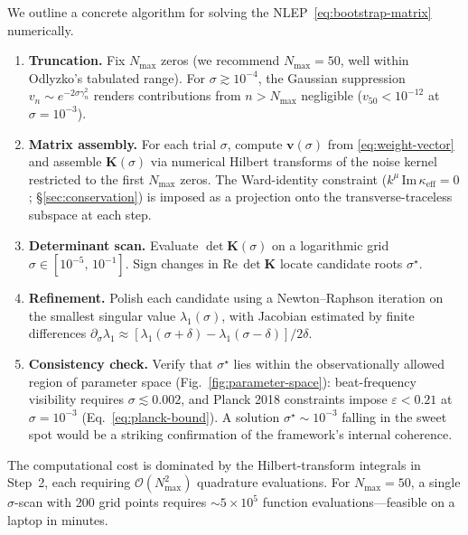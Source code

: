 \documentclass[12pt,a4paper]{article}
\begin{document}
We outline a concrete algorithm for solving the
NLEP~\eqref{eq:bootstrap-matrix} numerically.

\begin{enumerate}
  \item \textbf{Truncation.}
    Fix $N_{\max}$ zeros (we recommend $N_{\max} = 50$, well
    within Odlyzko's tabulated range).
    For $\sigma \gtrsim 10^{-4}$, the Gaussian suppression
    $v_{n} \sim e^{-2\sigma\gamma_{n}^{2}}$ renders contributions
    from $n > N_{\max}$ negligible ($v_{50} < 10^{-12}$ at
    $\sigma = 10^{-3}$).

  \item \textbf{Matrix assembly.}
    For each trial $\sigma$, compute $\mathbf{v}(\sigma)$ from
    \eqref{eq:weight-vector} and assemble $\mathbf{K}(\sigma)$
    via numerical Hilbert transforms of the noise kernel restricted
    to the first $N_{\max}$ zeros.
    The Ward-identity constraint
    ($k^{\mu}\,\mathrm{Im}\,\kappa_{\mathrm{eff}} = 0$;
    \S\ref{sec:conservation}) is imposed as a
    projection onto the transverse-traceless subspace at each step.

  \item \textbf{Determinant scan.}
    Evaluate $\det\mathbf{K}(\sigma)$ on a logarithmic grid
    $\sigma \in [10^{-5},\, 10^{-1}]$.
    Sign changes in $\mathrm{Re}\,\det\mathbf{K}$ locate
    candidate roots $\sigma^{\star}$.

  \item \textbf{Refinement.}
    Polish each candidate using a Newton--Raphson iteration on
    the smallest singular value $\lambda_{1}(\sigma)$,
    with Jacobian estimated by finite differences
    $\partial_{\sigma}\lambda_{1} \approx
    [\lambda_{1}(\sigma+\delta) - \lambda_{1}(\sigma-\delta)]
    / 2\delta$.

  \item \textbf{Consistency check.}
    Verify that $\sigma^{\star}$ lies within the observationally
    allowed region of parameter space
    (Fig.~\ref{fig:parameter-space}):
    beat-frequency visibility requires $\sigma \lesssim 0.002$,
    and Planck 2018 constraints impose
    $\varepsilon < 0.21$ at $\sigma = 10^{-3}$
    (Eq.~\eqref{eq:planck-bound}).
    A solution $\sigma^{\star} \sim 10^{-3}$ falling in the
    sweet spot would be a striking confirmation of the
    framework's internal coherence.
\end{enumerate}

The computational cost is dominated by the Hilbert-transform
integrals in Step~2, each requiring $\mathcal{O}(N_{\max}^{2})$
quadrature evaluations.
For $N_{\max} = 50$, a single $\sigma$-scan with 200 grid points
requires $\sim 5 \times 10^{5}$ function evaluations---feasible
on a laptop in minutes.
\end{document}
